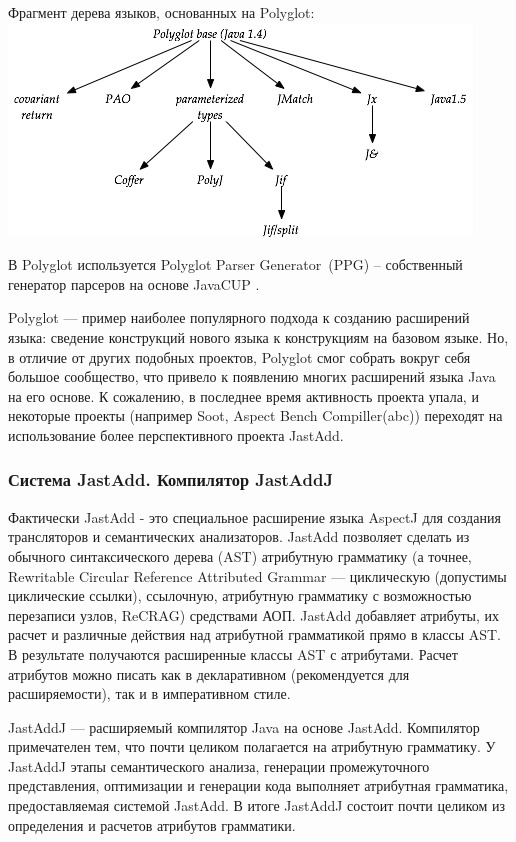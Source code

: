 \documentclass[a4paper,12pt,titlepage]{extarticle}
\begin{document}
\begin{center}
Фрагмент дерева языков, основанных на Polyglot:
\nopagebreak
 \includegraphics[scale=0.6]{img/polyglot-tree.png}
\end{center}

В Polyglot используется Polyglot Parser Generator~(PPG) -- собственный генератор
парсеров на основе JavaCUP \cite{javacup}.

Polyglot --- пример наиболее популярного подхода к созданию расширений языка:
сведение конструкций нового языка к конструкциям на базовом языке. Но, в
отличие от других подобных проектов, Polyglot смог собрать вокруг себя большое
сообщество, что привело к появлению многих расширений языка Java на его основе.
К сожалению, в последнее время активность проекта упала, и некоторые проекты
(например Soot, Aspect Bench Compiller(abc)) переходят на использование более
перспективного проекта JastAdd.

\subsubsection*{Система JastAdd. Компилятор JastAddJ}
Фактически JastAdd - это специальное расширение языка AspectJ для создания
трансляторов и семантических анализаторов. JastAdd позволяет сделать из
обычного синтаксического дерева (AST) атрибутную грамматику (а точнее, 
Rewritable Circular Reference Attributed Grammar --- циклическую (допустимы
циклические ссылки), ссылочную, атрибутную грамматику с возможностью
перезаписи узлов, ReCRAG) средствами АОП. JastAdd добавляет атрибуты, их расчет
и различные действия над атрибутной грамматикой прямо в классы AST. В
результате получаются расширенные классы AST с атрибутами. Расчет атрибутов
можно писать как в декларативном (рекомендуется для расширяемости), так и в
императивном стиле.

JastAddJ --- расширяемый компилятор Java на основе JastAdd. Компилятор
примечателен тем, что почти целиком полагается на атрибутную грамматику. У
JastAddJ этапы семантического анализа, генерации промежуточного представления,
оптимизации и генерации кода выполняет атрибутная грамматика, предоставляемая
системой JastAdd. В итоге JastAddJ состоит почти целиком из определения и
расчетов атрибутов грамматики.
\end{document}
